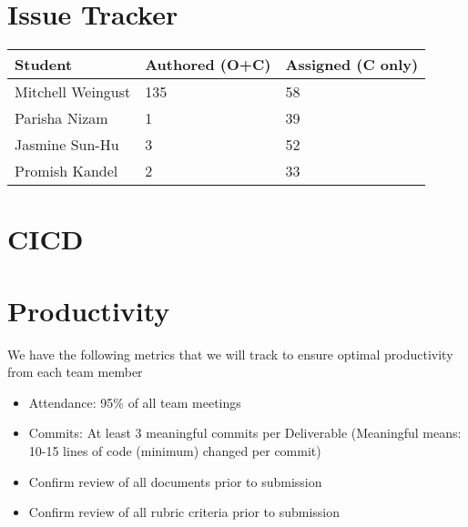 \documentclass{article}
\begin{document}

\section{Issue Tracker}

\begin{table}[H]
\centering
\begin{tabular}{lll}
\toprule
\textbf{Student} & \textbf{Authored (O+C)} & \textbf{Assigned (C only)}\\
\midrule
Mitchell Weingust & 135 & 58 \\
Parisha Nizam & 1 & 39 \\
Jasmine Sun-Hu & 3 & 52 \\
Promish Kandel & 2 & 33 \\
\bottomrule
\end{tabular}
\end{table}


\section{CICD}


\section{Productivity}
We have the following metrics that we will track to ensure optimal productivity from each team member

\begin{itemize}
    \item Attendance: 95\% of all team meetings
    \item Commits: At least 3 meaningful commits per Deliverable (Meaningful means: 10-15 lines of code (minimum) changed per commit)
    \item Confirm review of all documents prior to submission
    \item Confirm review of all rubric criteria prior to submission
  \end{itemize}
\end{document}
